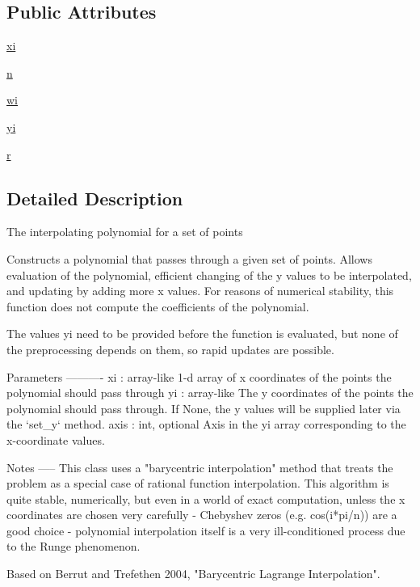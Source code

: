 \subsection*{Public Attributes}
\begin{DoxyCompactItemize}
\item 
\hyperlink{classscipy_1_1interpolate_1_1polyint_1_1BarycentricInterpolator_aaf509dcc7e95b9d62ad7fd5bdda71b5c}{xi}
\item 
\hyperlink{classscipy_1_1interpolate_1_1polyint_1_1BarycentricInterpolator_a74b8bd3f836d884be753a42e6b2cc5a7}{n}
\item 
\hyperlink{classscipy_1_1interpolate_1_1polyint_1_1BarycentricInterpolator_a460e26bb4cb90cb7adda25845b0e2d42}{wi}
\item 
\hyperlink{classscipy_1_1interpolate_1_1polyint_1_1BarycentricInterpolator_a781d8036afd2720c35382b19bbdf1b1d}{yi}
\item 
\hyperlink{classscipy_1_1interpolate_1_1polyint_1_1BarycentricInterpolator_a5babc41f34e4f597ca38ab9dc0e42507}{r}
\end{DoxyCompactItemize}


\subsection{Detailed Description}
\begin{DoxyVerb}The interpolating polynomial for a set of points

Constructs a polynomial that passes through a given set of points.
Allows evaluation of the polynomial, efficient changing of the y
values to be interpolated, and updating by adding more x values.
For reasons of numerical stability, this function does not compute
the coefficients of the polynomial.

The values yi need to be provided before the function is
evaluated, but none of the preprocessing depends on them, so rapid
updates are possible.

Parameters
----------
xi : array-like
    1-d array of x coordinates of the points the polynomial
    should pass through
yi : array-like
    The y coordinates of the points the polynomial should pass through.
    If None, the y values will be supplied later via the `set_y` method.
axis : int, optional
    Axis in the yi array corresponding to the x-coordinate values.

Notes
-----
This class uses a "barycentric interpolation" method that treats
the problem as a special case of rational function interpolation.
This algorithm is quite stable, numerically, but even in a world of
exact computation, unless the x coordinates are chosen very
carefully - Chebyshev zeros (e.g. cos(i*pi/n)) are a good choice -
polynomial interpolation itself is a very ill-conditioned process
due to the Runge phenomenon.

Based on Berrut and Trefethen 2004, "Barycentric Lagrange Interpolation".\end{DoxyVerb}
 


